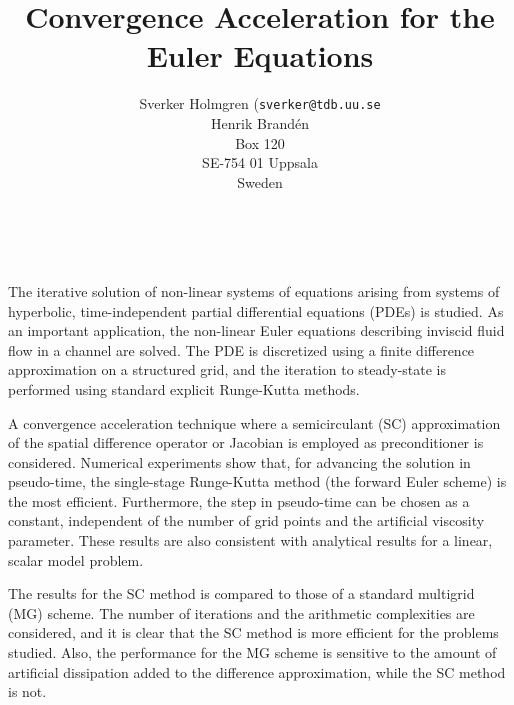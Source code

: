 \documentclass[11pt]{article}
\date{ ~ \hspace{-4mm}}
\title{Convergence Acceleration for the Euler Equations  }
\author{Sverker Holmgren ({\tt sverker@tdb.uu.se} \\ Henrik Brand\'{e}n \\ Box 120  \\  SE-754 01 Uppsala  \\  Sweden}
\begin{document}
\maketitle
\thispagestyle{empty}





 



The iterative solution of non-linear systems of equations arising from
systems of hyperbolic, time-independent partial differential 
equations (PDEs) is studied. As an important application, the 
non-linear Euler equations describing inviscid fluid flow in a
channel are solved. The PDE is discretized using a finite 
difference approximation on a structured grid, and the iteration to
steady-state is performed using standard explicit Runge-Kutta methods.



A convergence acceleration technique where a semicirculant (SC)
approximation of the spatial difference operator or Jacobian is
employed as preconditioner is considered. Numerical experiments
show that, for advancing the solution in pseudo-time, the single-stage
Runge-Kutta method (the forward Euler scheme) is the most efficient. 
Furthermore, the step in pseudo-time can be chosen as a constant, 
independent of the number of grid points and the artificial viscosity
parameter. These results are also consistent with analytical results
for a linear, scalar model problem.



The results for the SC method is compared to those of a standard
multigrid (MG) scheme. The number of iterations and the arithmetic
complexities are considered, and it is clear that the SC method is
more efficient for the problems studied. Also, the performance for
the MG scheme is sensitive to the amount of artificial dissipation
added to the difference approximation, while the SC method is not.  
\end{document}
